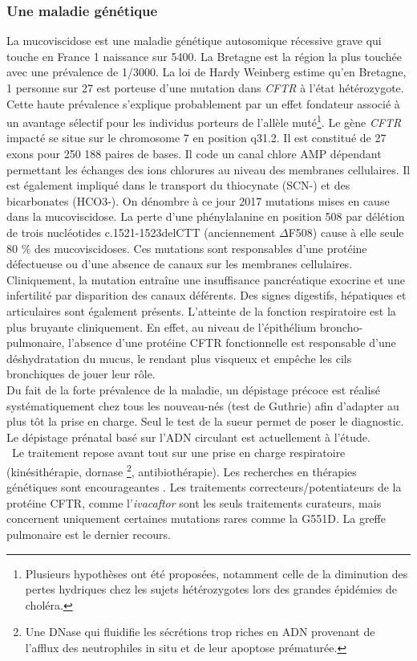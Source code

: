 \documentclass[12pt,a4paper]{article}
\begin{document}
\subsubsection{Une maladie génétique}
La mucoviscidose est une maladie génétique autosomique récessive grave qui touche en France 1 naissance sur 5400\cite{Registredelamuco.org}. La Bretagne est la région la plus touchée avec une prévalence de 1/3000\cite{Registredelamuco.org}.
La loi de Hardy Weinberg estime qu’en Bretagne, 1 personne sur 27 est porteuse d'une mutation dans \textit{CFTR} à l’état hétérozygote. Cette haute prévalence s’explique probablement par un effet fondateur associé à un avantage sélectif pour les individus porteurs de l’allèle muté\footnote{Plusieurs hypothèses ont été proposées, notamment celle de la diminution des pertes hydriques chez les sujets hétérozygotes lors des grandes épidémies de choléra.}.
Le gène \textit{CFTR} impacté se situe sur le chromosome 7 en position q31.2. Il est constitué de 27 exons pour 250 188\cite{OLeary2016} paires de bases. Il code un canal chlore AMP dépendant permettant les échanges des ions chlorures au niveau des membranes cellulaires. Il est également impliqué dans le transport du thiocynate (SCN-) et des bicarbonates (HCO3-)\cite{Quinton2001}.
On dénombre à ce jour 2017 mutations \cite{cftrdb} mises en cause dans la mucoviscidose. La perte d’une phénylalanine en position 508 par délétion de trois nucléotides c.1521-1523delCTT (anciennement $\Delta$F508) cause à elle seule 80 \% des mucoviscidoses\cite{cftrdb}.
Ces mutations sont responsables d’une protéine défectueuse ou d’une absence de canaux sur les membranes cellulaires. \\
Cliniquement, la mutation entraîne une insuffisance pancréatique exocrine et une infertilité par disparition des canaux déférents. Des signes digestifs, hépatiques et articulaires sont également présents.
L'atteinte de la fonction respiratoire est la plus bruyante cliniquement. En effet, au niveau de l’épithélium broncho-pulmonaire, l’absence d’une protéine CFTR fonctionnelle est responsable d’une déshydratation du mucus, le rendant plus visqueux et empêche les cils bronchiques de jouer leur rôle.\\
Du fait de la forte prévalence de la maladie, un dépistage précoce est réalisé systématiquement chez tous les nouveau-nés (test de Guthrie) afin d’adapter au plus tôt la prise en charge. Seul le test de la sueur permet de poser le diagnostic. Le dépistage prénatal basé sur l’ADN circulant est actuellement à l’étude\cite{Guissart2017}.\\\
Le traitement repose avant tout sur une prise en charge respiratoire (kinésithérapie, dornase \footnote{Une DNase qui fluidifie les sécrétions trop riches en ADN provenant de l'afflux des neutrophiles in situ et de leur apoptose prématurée.}, antibiothérapie). Les recherches en thérapies génétiques sont encourageantes \cite{Montier2004}.
Les traitements correcteurs/potentiateurs de la protéine CFTR, comme l'\textit{ivacaftor} sont les seuls traitements curateurs, mais concernent uniquement certaines mutations rares comme la G551D. La greffe pulmonaire est le dernier recours.
\end{document}

